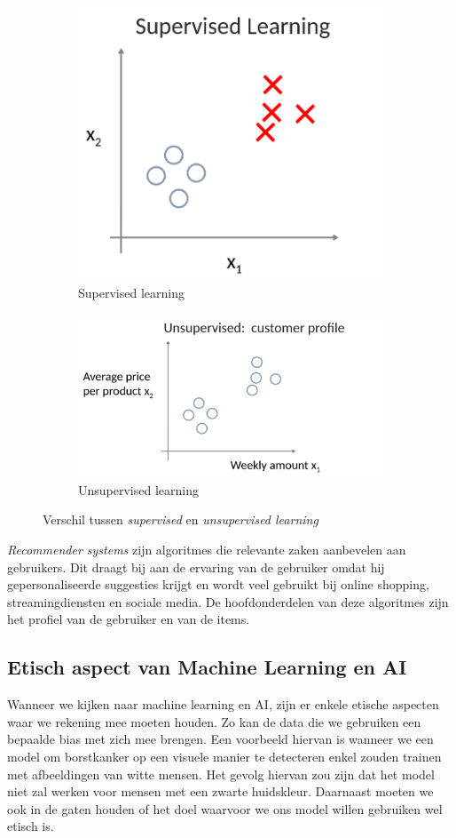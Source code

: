\begin{figure}[h]
	\centering
	\begin{subfigure}{.5\textwidth}
		\centering
		\includegraphics[height=0.45\textwidth]{images/1-supervised-learning.png}
		\caption{Supervised learning}
		\label{fig:supervised-learning}
	\end{subfigure}%
	\begin{subfigure}{.5\textwidth}
		\centering
		\includegraphics[height=0.45\textwidth]{images/2-unsupervised-learning.png}
		\caption{Unsupervised learning}
		\label{fig:unsupervised-learning}
	\end{subfigure}
	\caption{Verschil tussen \textit{supervised} en \textit{unsupervised learning}}
	\label{fig:supervised-vs-unsupervised-learning}
\end{figure}

\noindent
\textit{Recommender systems} zijn algoritmes die relevante zaken aanbevelen aan gebruikers. Dit draagt bij aan de ervaring van de gebruiker omdat hij gepersonaliseerde suggesties krijgt en wordt veel gebruikt bij online shopping, streamingdiensten en sociale media. De hoofdonderdelen van deze algoritmes zijn het profiel van de gebruiker en van de items.

\subsection{Etisch aspect van Machine Learning en AI}

Wanneer we kijken naar machine learning en AI, zijn er enkele etische aspecten waar we rekening mee moeten houden. Zo kan de data die we gebruiken een bepaalde bias met zich mee brengen. Een voorbeeld hiervan is wanneer we een model om borstkanker op een visuele manier te detecteren enkel zouden trainen met afbeeldingen van witte mensen. Het gevolg hiervan zou zijn dat het model niet zal werken voor mensen met een zwarte huidskleur. Daarnaast moeten we ook in de gaten houden of het doel waarvoor we ons model willen gebruiken wel etisch is. 
